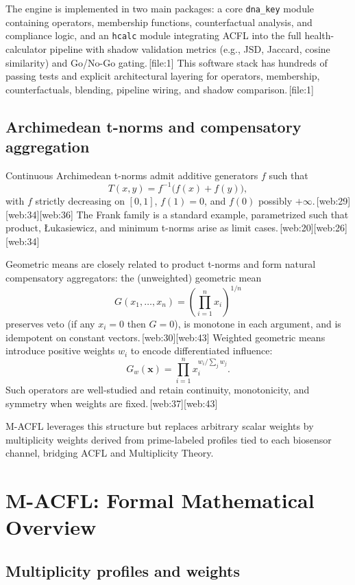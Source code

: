 \documentclass[11pt]{article}
\begin{document}
The engine is implemented in two main packages: a core \texttt{dna\_key} module containing operators, membership functions, counterfactual analysis, and compliance logic, and an \texttt{hcalc} module integrating ACFL into the full health-calculator pipeline with shadow validation metrics (e.g., JSD, Jaccard, cosine similarity) and Go/No-Go gating.\,[file:1] 
This software stack has hundreds of passing tests and explicit architectural layering for operators, membership, counterfactuals, blending, pipeline wiring, and shadow comparison.\,[file:1] 

\subsection{Archimedean t-norms and compensatory aggregation}

Continuous Archimedean t-norms admit additive generators $f$ such that
\[
T(x,y) = f^{-1}\big(f(x) + f(y)\big),
\]
with $f$ strictly decreasing on $[0,1]$, $f(1)=0$, and $f(0)$ possibly $+\infty$.\,[web:29][web:34][web:36] 
The Frank family is a standard example, parametrized such that product, {\L}ukasiewicz, and minimum t-norms arise as limit cases.\,[web:20][web:26][web:34] 

Geometric means are closely related to product t-norms and form natural compensatory aggregators: the (unweighted) geometric mean
\[
G(x_1,\dots,x_n) = \left(\prod_{i=1}^n x_i\right)^{1/n}
\]
preserves veto (if any $x_i = 0$ then $G=0$), is monotone in each argument, and is idempotent on constant vectors.\,[web:30][web:43] 
Weighted geometric means introduce positive weights $w_i$ to encode differentiated influence:
\[
G_w(\mathbf{x}) = \prod_{i=1}^n x_i^{w_i / \sum_j w_j}.
\]
Such operators are well-studied and retain continuity, monotonicity, and symmetry when weights are fixed.\,[web:37][web:43] 

M-ACFL leverages this structure but replaces arbitrary scalar weights by multiplicity weights derived from prime-labeled profiles tied to each biosensor channel, bridging ACFL and Multiplicity Theory.

\section{M-ACFL: Formal Mathematical Overview}

\subsection{Multiplicity profiles and weights}
\end{document}

